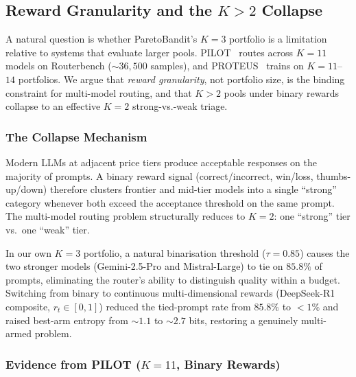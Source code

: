 
\subsection{Reward Granularity and the \texorpdfstring{$K{>}2$}{K>2} Collapse}
\label{sec:reward_discrimination}

A natural question is whether ParetoBandit's $K{=}3$ portfolio is
a limitation relative to systems that evaluate larger pools.
PILOT~\cite{panda2025pilot} routes across $K{=}11$ models on
Routerbench (${\sim}36{,}500$ samples),
and PROTEUS~\cite{bhatti2026proteus} trains on $K{=}11$--$14$
portfolios.
We argue that \emph{reward granularity}, not portfolio size,
is the binding constraint for multi-model routing,
and that $K{>}2$ pools under binary rewards collapse to an
effective $K{=}2$ strong-vs.-weak triage.

\subsubsection{The Collapse Mechanism}

Modern LLMs at adjacent price tiers produce acceptable responses on
the majority of prompts.
A binary reward signal (correct/incorrect, win/loss, thumbs-up/down)
therefore clusters frontier and mid-tier models into a single
``strong'' category whenever both exceed the acceptance threshold
on the same prompt.
The multi-model routing problem structurally reduces to
$K{=}2$: one ``strong'' tier vs.\ one ``weak'' tier.

In our own $K{=}3$ portfolio, a natural binarisation threshold
($\tau{=}0.85$) causes the two stronger models (Gemini-2.5-Pro and
Mistral-Large) to tie on $85.8\%$ of prompts, eliminating the
router's ability to distinguish quality within a budget.
Switching from binary to continuous multi-dimensional rewards
(DeepSeek-R1 composite, $r_t \in [0,1]$) reduced the tied-prompt
rate from $85.8\%$ to ${<}1\%$ and raised best-arm entropy from
${\sim}1.1$ to ${\sim}2.7$ bits, restoring a genuinely multi-armed
problem.

\subsubsection{Evidence from PILOT (\texorpdfstring{$K{=}11$}{K=11}, Binary Rewards)}

